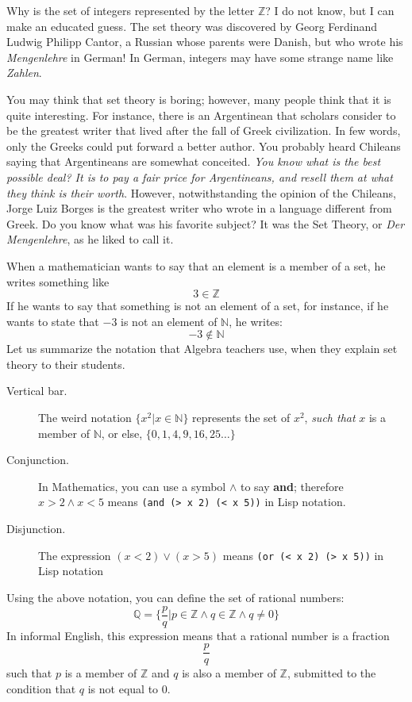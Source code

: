 \documentclass[a4paper,12pt]{book}
\begin{document}

Why is the set of integers represented by the letter $\mathbb{Z}$? I do not know,
but I can make an educated guess. The set theory was discovered by Georg Ferdinand
Ludwig Philipp Cantor, a Russian whose parents were Danish, but who  wrote
his {\em Mengenlehre} in German! In German, integers may have some strange name like {\em Zahlen}.


You may think that set theory is boring; however, many people think that it is quite interesting. For instance, there is an Argentinean that scholars consider to be the greatest writer that lived after the fall of Greek civilization. In few words, only the Greeks could put forward a better author. You probably heard Chileans saying  that Argentineans are somewhat conceited. {\em You know what is the best possible deal? It is to pay a fair price for Argentineans, and resell them at what they think is their worth}. However, notwithstanding the opinion of the Chileans, Jorge Luiz Borges is the greatest writer who wrote in a language different from Greek.
Do you know what was his favorite subject? It was the Set Theory, or {\em Der Mengenlehre}, as he liked to call it.

When a mathematician wants to say that an element is a member of a set, he writes something like
$$3  \in \mathbb{Z}$$
If he wants to say that something is not an element of a set, for instance, if he wants to state that $-3$ is not an element of $\mathbb{N}$, he writes:
$$-3  \notin  \mathbb{N}$$
Let us summarize the notation that Algebra teachers use, when they explain set theory to their students.
\begin{description}
\item[Vertical bar.] The weird notation $\{x^2 | x \in \mathbb{N}\}$
represents the set of
 $x^2$, {\em such that} $x$ is a member of $\mathbb{N}$, or else,
$\{0, 1, 4, 9, 16, 25\ldots\}$
\item[Conjunction.] In Mathematics, you can use a symbol $\wedge$
to say {\bf\small and}; therefore $x>2 \wedge x<5$ means 
\verb|(and (> x 2) (< x 5))| in Lisp notation.
\item[Disjunction.] The expression
$(x<2) \vee (x>5)$
means \verb|(or (< x 2) (> x 5))| in Lisp notation
\end{description}
Using the above notation, you can define the set of rational numbers:
$$\mathbb{Q}=\{\frac{p}{q} | p \in \mathbb{Z} \wedge q \in \mathbb{Z} 
\wedge q \neq 0\}$$
In informal English, this expression means that a rational number is a fraction $$\frac{p}{q}$$ such that $p$ is a member of $\mathbb{Z}$ and $q$ is also a member of $\mathbb{Z}$, submitted to the condition that $q$ is not equal to $0$.
\end{document}
